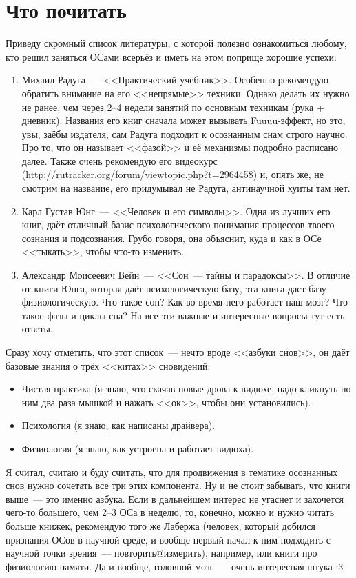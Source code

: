 \documentclass[a5paper,12pt,twoside]{memoir}
\begin{document}
\section{Что почитать}

Приведу скромный список литературы, с которой полезно ознакомиться любому, кто решил заняться ОСами всерьёз и иметь на этом поприще хорошие успехи:
\begin{enumerate}
\item Михаил Радуга~--- <<Практический учебник>>. Особенно рекомендую обратить внимание на его <<непрямые>> техники. Однако делать их нужно не ранее, чем через 2--4 недели занятий по основным техникам (рука + дневник). Названия его книг сначала может вызывать Fuuuu-эффект, но это, увы, заёбы издателя, сам Радуга подходит к осознанным снам строго научно. Про то, что он называет <<фазой>> и её механизмы подробно расписано далее. Также очень рекомендую его видеокурс (\url{http://rutracker.org/forum/viewtopic.php?t=2964458}) и, опять же, не смотрим на название, его придумывал не Радуга, антинаучной хуиты там нет.
\item Карл Густав Юнг~--- <<Человек и его символы>>. Одна из лучших его книг, даёт отличный базис психологического понимания процессов твоего сознания и подсознания. Грубо говоря, она объяснит, куда и как в ОСе <<тыкать>>, чтобы что-то изменить. 
\item Александр Моисеевич Вейн~--- <<Сон~--- тайны и парадоксы>>. В отличие от книги Юнга, которая даёт психологическую базу, эта книга даст базу физиологическую. Что такое сон? Как во время него работает наш мозг? Что такое фазы и циклы сна? На все эти важные и интересные вопросы тут есть ответы.
\end{enumerate} 

Сразу хочу отметить, что этот список~--- нечто вроде <<азбуки снов>>, он даёт базовые знания о трёх <<китах>> сновидений:
\begin{itemize}
\item Чистая практика (я знаю, что скачав новые дрова к видюхе, надо кликнуть по ним два раза мышкой и нажать <<ок>>, чтобы они установились).
\item Психология (я знаю, как написаны драйвера).
\item Физиология (я знаю, как устроена и работает видюха).
\end{itemize}

\makeatletter
Я считал, считаю и буду считать, что для продвижения в тематике осознанных снов нужно сочетать все три этих компонента. 
Ну и не стоит забывать, что книги выше~--- это именно азбука. Если в дальнейшем интерес не угаснет и захочется чего-то большего, чем 2--3 ОСа в неделю, то, конечно, можно и нужно читать больше книжек, рекомендую того же Лабержа (человек, который добился признания ОСов в научной среде, и вообще первый начал к ним подходить с научной точки зрения~--- повторить@измерить), например, или книги про физиологию памяти. Да и вообще, головной мозг~--- очень интересная штука :3
\makeatother
\end{document}

